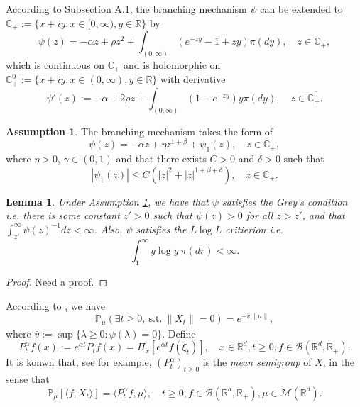 \documentclass[12pt,a4paper]{amsart}
\theoremstyle{plain}
\newtheorem{lem}[thm]{Lemma}
\theoremstyle{definition}
\newtheorem{asp}{Assumption}
\numberwithin{equation}{section}
\begin{document}
   According to  Subsection A.1, the branching mechanism $\psi$ can be extended to
    $\mathbb C_+:=\{x+iy: x\in [0, \infty), y\in \mathbb R\}$ by
 \[\psi(z)=
    - \alpha z + \rho z^2 + \int_{(0,\infty)} (e^{-zy} - 1 + zy) \pi(dy),
    \quad  z \in \mathbb C_+,\]
    which is continuous on $\mathbb C_+$ and is holomorphic on $\mathbb C_+^0:=
    \{x+iy: x\in (0, \infty), y\in \mathbb R\}$ with derivative
\begin{equation}
\label{eq: deriavetive of the Poission part}
    \psi'(z) := -\alpha + 2\rho z+ \int_{(0,\infty)} (1-e^{-zy}) y\pi(dy),
    \quad z\in \mathbb C^0_+.
\end{equation}
{ \bf
\begin{asp}
\label{asp: branching mechanism}
    The branching mechanism takes the form of
\[
    \psi(z) = -\alpha z + \eta z^{1+\beta} + \psi_1(z),\quad z\in \mathbb C_+,
\]
    where $\eta > 0$, $\gamma \in (0,1)$ and that there exists $C >0$ and $\delta >0$ such that
\[
    |\psi_1(z)| \leq C(|z|^2+|z|^{1+\beta + \delta}),\quad z\in \mathbb C_+.
\]
\end{asp}
\begin{lem}
    Under Assumption \ref{asp: branching mechanism}, we have that $\psi$ satisfies the Grey's condition i.e. there is some constant $z' > 0$ such that $\psi(z) > 0$ for all $z>z'$, and that $\int_{z'}^\infty \psi(z)^{-1}dz < \infty$.
    Also, $\psi$ satisfies the $L \log L$ critierion  i.e.
\[
    \int_1^\infty y \log y~\pi(dr)< \infty.
\]
\end{lem}
\begin{proof}
    { Need a proof.}
\end{proof}
}
    According to \cite[Theorem 12.5 \& Theorem 12.7]{Kyprianou2014Fluctuations}, we have
\begin{equation}
    \mathbb{P}_{\mu} (\exists t\geq 0,~\text{s.t.}~\|X_t\|=0)
    = e^{-\bar v \|\mu\|},
\end{equation}
    where $\bar v := \sup\{\lambda \geq 0: \psi(\lambda) = 0\}$.
    Define
\begin{equation}\label{meansemigroup}
    P^{\alpha}_t f(x)
    :=
    e^{\alpha t} P_t f(x) =
    \Pi_x [e^{\alpha t}f(\xi_t)],
    \quad x\in \mathbb R^d,t\geq 0, f\in \mathcal B(\mathbb R^d, \mathbb R_+).
\end{equation}
    It is konwn that, see \cite[Proposition 2.27]{Li2011Measure-valued} for example, $(P^\alpha_t)_{t\geq 0}$ is the \emph{mean semigroup} of $X$, in the sense that
\begin{equation}\label{eq:meanformula}
    \mathbb{P}_{\mu}[\langle f, X_t \rangle]
    = \langle P^\alpha_t f, \mu \rangle,
    \quad t\geq 0, f\in \mathcal B(\mathbb R^d, \mathbb R_+), \mu \in \mathcal M(\mathbb R^d).
\end{equation}
\end{document}
